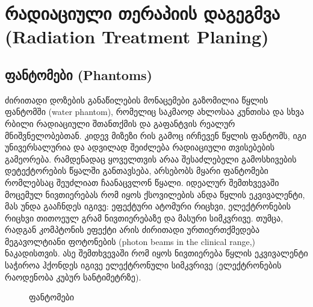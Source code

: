\documentclass[12pt,a4paper,]{report}
\begin{document}
\chapter{რადიაციული თერაპიის დაგეგმვა (Radiation Treatment Planing)}
\section{ფანტომები (Phantoms)}
ძირითადი დოზების განაწილების მონაცემები გაზომილია წყლის ფანტომში (water phantom), რომელიც საკმაოდ ახლოსაა კუნთისა და სხვა რბილი რადიაციული შთანთქმის და გაფანტვის რეალურ მნიშვნელობებთან. კიდევ მიზეზი რის გამოც ირჩევენ წყლის ფანტომს, იგი უნივერსალურია და ადვილად შეიძლება რადიაციული თვისებების გამეორება. რამდენადაც ყოველთვის არაა შესაძლებელი გამოსხივების დეტექტორების წყალში განთავსება, არსებობს მყარი ფანტომები რომლებსაც შეუძლიათ ჩაანაცვლონ წყალი. იდეალურ შემთხვევაში მოცემულ ნივთიერებას რომ იყოს ქსოვილების ანდა წყლის ეკვივალენტი, მას უნდა გააჩნდეს იგივე: ეფექტური ატომური რიცხვი, ელექტრონების რიცხვი თითოეულ გრამ ნივთიერებაზე და მასური სიმკვრივე. თუმცა, რადგან კომპტონის ეფექტი არის ძირითადი ურთიერთქმედება მეგავოლტიანი ფოტონების (photon beams in the clinical range,) ნაკადისთვის. ასე შემთხვევაში რომ იყოს ნივთიერება წყლის ეკვივალენტი საჭიროა ჰქონდეს იგივე ელექტრონული სიმკვრივე (ელექტრონების რაოდენობა კუბურ სანტიმეტრზე).

	\begin{figure}[h]%
    	\centering
    	\qquad
    	\caption{ფანტომები}%
    	\label{fig:phantom}%
	\end{figure}
\end{document}
